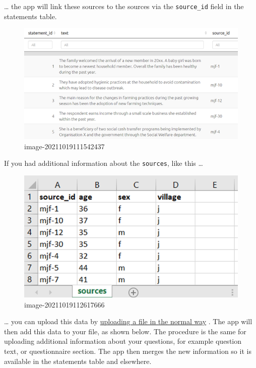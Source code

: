 \documentclass[
]{book}
\begin{document}
\ldots{} the app will link these sources to the sources via the \texttt{source\_id} field in the statements table.

\begin{figure}
\centering
\includegraphics[width=6.77083in,height=\textheight]{_assets/image-20211019111542437.png}
\caption{image-20211019111542437}
\end{figure}

If you had additional information about the \texttt{sources}, like this \ldots{}

\begin{figure}
\centering
\includegraphics[width=6.77083in,height=\textheight]{_assets/image-20211019112617666.png}
\caption{image-20211019112617666}
\end{figure}

\ldots{} you can upload this data by \protect\hyperlink{upload-summary}{uploading a file in the normal way} . The app will then add this data to your file, as shown below. The procedure is the same for uploading additional information about your questions, for example question text, or questionnaire section. The app then merges the new information so it is available in the statements table and elsewhere.
\end{document}
